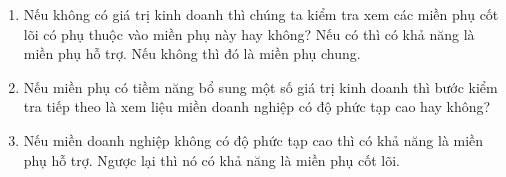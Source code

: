 \begin{itemize}
\begin{enumerate}
              \item Nếu không có giá trị kinh doanh thì chúng ta kiểm tra xem các miền phụ cốt lõi có phụ thuộc vào miền phụ này hay không? Nếu có thì có khả năng là miền phụ hỗ trợ. Nếu không thì đó là miền phụ chung.

              \item Nếu miền phụ có tiềm năng bổ sung một số giá trị kinh doanh thì bước kiểm tra tiếp theo là xem liệu miền doanh nghiệp có độ phức tạp cao hay không?

              \item Nếu miền doanh nghiệp không có độ phức tạp cao thì có khả năng là miền phụ hỗ trợ. Ngược lại thì nó có khả năng là miền phụ cốt lõi.

          \end{enumerate}

\end{itemize}
